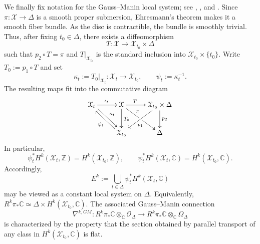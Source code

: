 \documentclass[11pt,letterpaper]{amsart}
\numberwithin{equation}{section}
\newcommand{\CC}{\mathbb{C}}
\newcommand{\ZZ}{\mathbb{Z}}
\newcommand{\cal}{\mathcal}
\def\cO{{\cal O}}
\def\cX{{\cal X}}
\def\beq{\begin{equation}}
\def\eeq{\end{equation}}
\begin{document}
We finally fix notation for the Gauss--Manin local system; see \cite[Chapter 10]{V}, \cite[Section II.1]{G68}, and \cite[Chapter 4]{CMP}. Since $\pi:\cX\to\Delta$ is a smooth proper submersion, Ehresmann's theorem makes it a smooth fiber bundle. As the disc is contractible, the bundle is smoothly trivial. Thus, after fixing $t_0\in\Delta$, there exists a diffeomorphism
\beq\label{eq:triv}
T:\cX\longrightarrow\cX_{t_0}\times\Delta
\eeq
such that $p_2\circ T=\pi$ and $T|_{\cX_{t_0}}$ is the standard inclusion into $\cX_{t_0}\times\{t_0\}$. Write $T_0:=p_1\circ T$ and set
\[
 \kappa_t:=T_0|_{\cX_t}:\cX_t\to\cX_{t_0},
 \qquad \psi_t:=\kappa_t^{-1}.
\]
The resulting maps fit into the commutative diagram
\begin{equation}\label{diagram-1}
\xymatrix{
\cX_t \ar[r]^{\iota_t} \ar@<.5ex>[rd]^{\kappa_t}  &  \cX\ar[d]^{T_0}\ar[r]^(0.35){T}\ar[rd]^(0.35){\pi}|\hole  & \cX_{t_0}\times\Delta \ar[dl]^(0.6){p_1}\ar[d]^{p_2}\\
& \cX_{t_0}\ar@<.5ex>[lu]^{\psi_t}  & \Delta
}
\end{equation}
In particular,
\beq\label{iden-1}
\psi_t^*H^k(\cX_t,\ZZ)=H^k(\cX_{t_0},\ZZ),
\qquad
\psi_t^*H^k(\cX_t,\CC)=H^k(\cX_{t_0},\CC).
\eeq
Accordingly,
\beq\label{iden-2}
E^k:=\bigcup_{t\in\Delta}\psi_t^*H^k(\cX_t,\CC)
\eeq
may be viewed as a constant local system on $\Delta$. Equivalently,
$R^k\pi_*\CC\simeq\Delta\times H^k(\cX_{t_0},\CC)$. The associated Gauss--Manin connection
\[
\nabla^{k,GM}:R^k\pi_*\CC\otimes_{\CC}\cO_\Delta
\longrightarrow R^k\pi_*\CC\otimes_{\CC}\Omega_\Delta
\]
is characterized by the property that the section obtained by parallel transport of any class in $H^k(\cX_{t_0},\CC)$ is flat.
\end{document}
